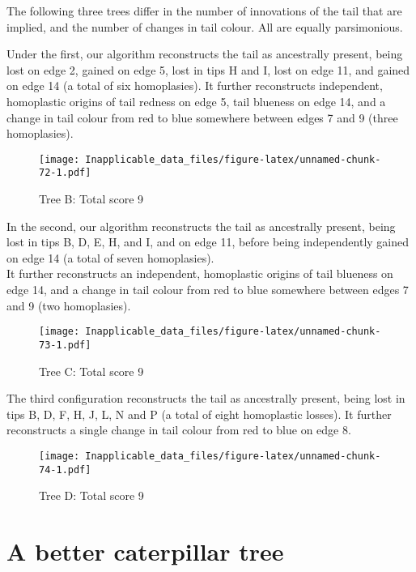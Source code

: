 \documentclass[]{book}
\theoremstyle{definition}
\theoremstyle{definition}
\theoremstyle{definition}
\theoremstyle{remark}
\begin{document}
The following three trees differ in the number of innovations of the
tail that are implied, and the number of changes in tail colour. All are
equally parsimonious.

Under the first, our algorithm reconstructs the tail as ancestrally
present, being lost on edge 2, gained on edge 5, lost in tips H and I,
lost on edge 11, and gained on edge 14 (a total of six homoplasies). It
further reconstructs independent, homoplastic origins of tail redness on
edge 5, tail blueness on edge 14, and a change in tail colour from red
to blue somewhere between edges 7 and 9 (three homoplasies).

\begin{figure}
\centering
\texttt{[image: Inapplicable\_data\_files/figure-latex/unnamed-chunk-72-1.pdf]}
\caption{\label{fig:unnamed-chunk-72}Tree B: Total score 9}
\end{figure}

In the second, our algorithm reconstructs the tail as ancestrally
present, being lost in tips B, D, E, H, and I, and on edge 11, before
being independently gained on edge 14 (a total of seven homoplasies).\\
It further reconstructs an independent, homoplastic origins of tail
blueness on edge 14, and a change in tail colour from red to blue
somewhere between edges 7 and 9 (two homoplasies).

\begin{figure}
\centering
\texttt{[image: Inapplicable\_data\_files/figure-latex/unnamed-chunk-73-1.pdf]}
\caption{\label{fig:unnamed-chunk-73}Tree C: Total score 9}
\end{figure}

The third configuration reconstructs the tail as ancestrally present,
being lost in tips B, D, F, H, J, L, N and P (a total of eight
homoplastic losses). It further reconstructs a single change in tail
colour from red to blue on edge 8.

\begin{figure}
\centering
\texttt{[image: Inapplicable\_data\_files/figure-latex/unnamed-chunk-74-1.pdf]}
\caption{\label{fig:unnamed-chunk-74}Tree D: Total score 9}
\end{figure}

\hypertarget{a-better-caterpillar-tree}{%
\section{A better caterpillar tree}\label{a-better-caterpillar-tree}}
\end{document}
